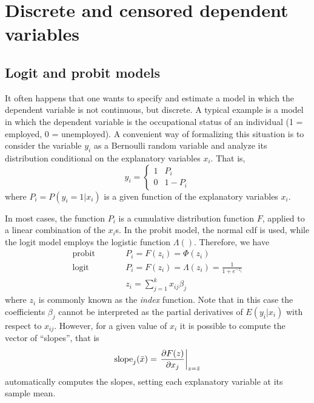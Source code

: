 \chapter{Discrete and censored dependent variables}
\label{chap:discr-models}

\section{Logit and probit models}
\label{sec:logit-probit}

It often happens that one wants to specify and estimate a model in
which the dependent variable is not continuous, but discrete. A
typical example is a model in which the dependent variable is the
occupational status of an individual (1 = employed, 0 = unemployed). A
convenient way of formalizing this situation is to consider the
variable $y_i$ as a Bernoulli random variable and analyze its
distribution conditional on the explanatory variables $x_i$.  That is,
%
\begin{equation}
  \label{eq:qr-Bernoulli}
  y_i = \left\{ 
    \begin{array}{ll} 
      1 & P_i \\ 0 & 1 - P_i 
    \end{array}
    \right.
\end{equation}
%
where $P_i = P(y_i = 1 | x_i) $ is a given function of the explanatory
variables $x_i$.

In most cases, the function $P_i$ is a cumulative distribution
function $F$, applied to a linear combination of the $x_i$s. In the
probit model, the normal cdf is used, while the logit model employs
the logistic function $\Lambda()$. Therefore, we have
%
\begin{eqnarray}
  \label{eq:qr-link}
  \textrm{probit} & \qquad & P_i = F(z_i) = \Phi(z_i)  \\
  \textrm{logit}  & \qquad & P_i = F(z_i) = \Lambda(z_i) = \frac{1}{1 + e^{-z_i}} \\
  & &z_i = \sum_{j=1}^k x_{ij} \beta_j
\end{eqnarray}
%
where $z_i$ is commonly known as the \emph{index} function. Note that
in this case the coefficients $\beta_j$ cannot be interpreted as the
partial derivatives of $E(y_i | x_i)$ with respect to
$x_{ij}$.  However, for a given value of $x_i$ it is possible to
compute the vector of ``slopes'', that is
\[
  \mathrm{slope}_j(\bar{x}) = \left. \frac{\partial F(z)}{\partial x_j} \right|_{z =
    \bar{z}}
\]
 automatically computes the slopes, setting each
explanatory variable at its sample mean.

